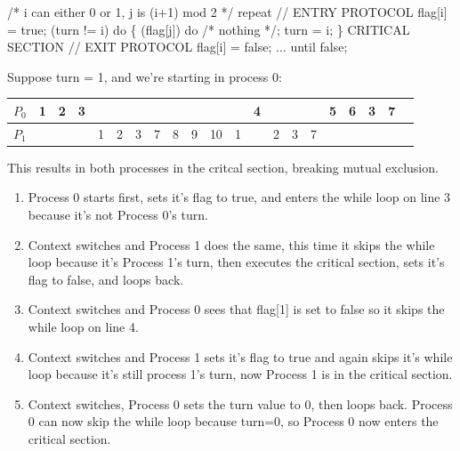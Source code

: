 \documentclass[11pt]{article}
\newcommand{\n}{\vspace{0.3cm}}
\begin{document}
\begin{enumerate}
    \begin{codebox}
     \zi /* i can either 0 or 1, j is (i+1) mod 2 */
     \li repeat \Do
        \zi // ENTRY PROTOCOL
        \li flag[i] = true;
        \li \While (turn != i) do \{\Do
          \li \While (flag[j]) do /* nothing */;
          \li turn = i;
        \End
        \li \}
        \li CRITICAL SECTION
        \zi // EXIT PROTOCOL
        \li flag[i] = false;
        \li \(\hdots\)
     \End
     \li until false;
    \end{codebox}
    Suppose turn = 1, and we're starting in process 0:

    \begin{tabular}{|c|c|c|c|c|c|c|c|c|c|c|c|c|c|c|c|c|c|c|c|c|}
      \hline
      \(P_0\) & 1 & 2 & 3 &   &   &   &   &   &   &    &   & 4 &   &   &   & 5 & 6 & 3 & 7 \\
      \hline
      \(P_1\) &   &   &   & 1 & 2 & 3 & 7 & 8 & 9 & 10 & 1 &   & 2 & 3 & 7 &   &   &   &   \\
      \hline
    \end{tabular}

    This results in both processes in the critcal section, breaking mutual exclusion. \n

    \begin{enumerate}[label=\arabic*)]
      \item Process 0 starts first, sets it's flag to true, and enters the while loop on line 3 because it's not Process 0's turn. \n

      \item Context switches and Process 1 does the same, this time it skips the while loop because it's Process 1's turn, then executes the critical section, sets it's flag to false, and loops back. \n

      \item Context switches and Process 0 sees that flag[1] is set to false so it skips the while loop on line 4. \n

      \item Context switches and Process 1 sets it's flag to true and again skips it's while loop because it's still process 1's turn, now Process 1 is in the critical section. \n

      \item Context switches, Process 0 sets the turn value to 0, then loops back.  Process 0 can now skip the while loop because turn=0, so Process 0 now enters the critical section. \n


\end{enumerate}
\end{enumerate}
\end{document}

